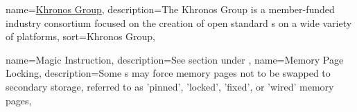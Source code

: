 \newcommand{\dvttermjit}{\dvtcmdabbrev{dvtglossjit}}
\newcommand{\dvttermjni}{\dvtcmdabbrev{dvtglossjni}}

{
  name={\href{http://en.wikipedia.org/wiki/Khronos_Group}{Khronos Group}},
  description={The Khronos Group is a member-funded industry consortium focused on the creation of open standard \dvttermapi s on a wide variety of platforms},
  sort={Khronos Group},
}
\newcommand{\dvttermkhronos}{\glslink{dvtglosskhronos}{Khronos}}
\newcommand{\dvttermkvm}{\dvtcmdabbrev{dvtglosskvm}}

\newcommand{\dvttermlinux}{Linux}
\newcommand{\dvttermlockheedmartin}{Lockheed Martin}

\newcommand{\dvttermmipsecond}{\dvtcmdabbrev{dvtglossmipssecond}}
\newcommand{\dvttermmicrosoft}{Microsoft}
{
  name={Magic Instruction},
  description={See section  under },
}
\newcommand{\dvttermmagicinstruction}{\dvtcmdcaponcegloss{dvtglossmagicinstruction}{Magic Instruction}}
\newcommand{\dvttermmmu}{\dvtcmdabbrev{dvtglossmmu}}
{
  name={Memory Page Locking},
  description={Some \dvttermos s may force memory pages not to be swapped to secondary storage, referred to as 'pinned', 'locked', 'fixed', or 'wired' memory pages},
}

\newcommand{\dvttermnasa}{NASA}
\newcommand{\dvttermnortel}{Nortel Networks Corporation}
\newcommand{\dvttermnorthropgrumman}{Northrop Grumman Corporation}

\newcommand{\dvttermopengl}{OpenGL}
\newcommand{\dvttermopengles}{\dvttermopengl ~ES}
\newcommand{\dvttermopenglestwopointo}{\dvttermopengles ~\dvtcmdnum{2.0}}
\newcommand{\dvttermos}{\dvtcmdabbrev{dvtglossos}}

